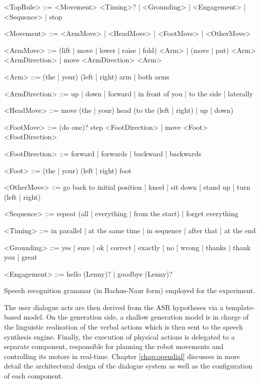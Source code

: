 \begin{table}[p]
\begin{grammar}

<TopRule> ::= <Movement> <Timing>? | <Grounding> | <Engagement> | <Sequence> | stop

<Movement> ::= <ArmMove> | <HeadMove> | <FootMove> |  <OtherMove>

<ArmMove> ::= (lift | move | lower | raise | fold) <Arm> | (move | put) <Arm> <ArmDirection> | move <ArmDirection> <Arm>

<Arm> ::= (the | your) (left | right) arm | both arms

<ArmDirection> ::= up | down | forward | in front of you | to the side | laterally

<HeadMove> ::= move (the | your) head (to the (left | right) | up | down)

<FootMove> ::= (do one)? step <FootDirection> | move <Foot> <FootDirection>

<FootDirection> ::= forward | forwards | backward | backwards

<Foot> ::= (the | your) (left | right) foot

<OtherMove> ::= go back to initial position | kneel | sit down | stand up | turn (left | right)  

<Sequence> ::= repeat (all | everything | from the start) | forget everything

<Timing> ::= in parallel | at the same time | in sequence | after that | at the end

<Grounding> ::= yes | sure | ok | correct | exactly | no | wrong  | thanks | thank you | great

<Engagement> ::= hello (Lenny)? | goodbye (Lenny)? 

\end{grammar}
\caption{Speech recognition grammar (in Bachus-Naur form) employed for the experiment.}
\label{table:asr_woz}
\end{table}


The user dialogue acts are then derived from the ASR hypotheses via a template-based model. On the generation side, a shallow generation model is in charge of the linguistic realisation of the verbal actions which is then sent to the speech synthesis engine.  Finally, the execution of physical actions is delegated to a separate component, responsible for planning the robot movements and controlling its motors in real-time.  Chapter \ref{chap:opendial} discusses in more detail the architectural design of the dialogue system as well as the configuration of each component. 


